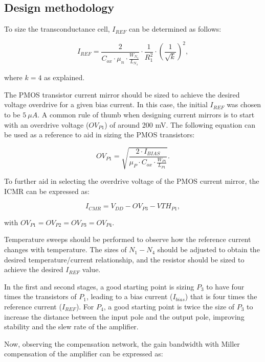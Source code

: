 \documentclass[12pt]{article}
\begin{document}
\subsection{Design methodology}

To size the transconductance cell, $I_{REF}$ can be determined as follows:

\begin{equation} I_{REF} = \frac{2}{C_{ox} \cdot \mu_n \cdot \frac{W_{N_{4}}}{L_{N_{4}}}} \cdot \frac{1}{R_1^2} \cdot \left(\frac{1}{\sqrt{k}}\right)^2, \label{eq
} \end{equation}

where $k=4$ as explained.

The PMOS transistor current mirror should be sized to achieve the desired voltage overdrive for a given bias current. In this case, the initial $I_{REF}$ was chosen to be $5\ \mu A$. A common rule of thumb when designing current mirrors is to start with an overdrive voltage ($OV_{P1}$) of around 200 mV. The following equation can be used as a reference to aid in sizing the PMOS transistors:

\begin{equation} OV_{P1} = \sqrt{\frac{2 \cdot I_{BIAS}}{\mu_{P} \cdot C_{ox} \cdot \frac{W_{P1}}{L_{P1}}}}. \end{equation}

To further aid in selecting the overdrive voltage of the {PMOS} current mirror, the ICMR can be expressed as:

\begin{equation} I_{CMR} = V_{DD} - OV_{P3} - VTH_{P1}, \end{equation}

with $OV_{P1} = OV_{P2} = OV_{P3} = OV_{P4}$.

Temperature sweeps should be performed to observe how the reference current changes with temperature. The sizes of $N_1 - N_4$ should be adjusted to obtain the desired temperature/current relationship, and the resistor should be sized to achieve the desired $I_{REF}$ value.

In the first and second stages, a good starting point is sizing $P_3$ to have four times the transistors of $P_1$, leading to a bias current ($I_{bias}$) that is four times the reference current ($I_{REF}$). For $P_4$, a good starting point is twice the size of $P_3$ to increase the distance between the input pole and the output pole, improving stability and the slew rate of the amplifier.

Now, observing the compensation network, the gain bandwidth with Miller compensation of the amplifier can be expressed as:
\end{document}
